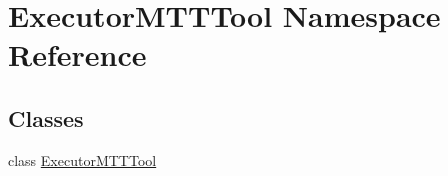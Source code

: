 \hypertarget{namespace_executor_m_t_t_tool}{\section{Executor\-M\-T\-T\-Tool Namespace Reference}
\label{namespace_executor_m_t_t_tool}
}
\subsection*{Classes}
\begin{DoxyCompactItemize}
\item 
class \hyperlink{class_executor_m_t_t_tool_1_1_executor_m_t_t_tool}{Executor\-M\-T\-T\-Tool}
\end{DoxyCompactItemize}
